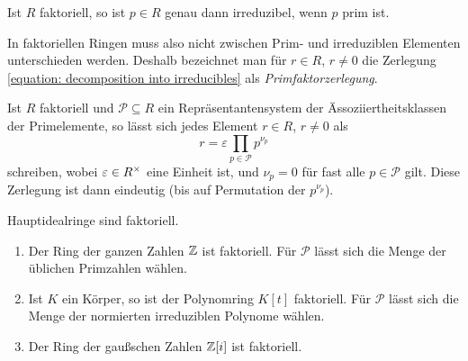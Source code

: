 \begin{lemma}
  Ist $R$ faktoriell, so ist $p \in R$ genau dann irreduzibel, wenn $p$ prim ist.
\end{lemma}

In faktoriellen Ringen muss also nicht zwischen Prim- und irreduziblen Elementen unterschieden werden.
Deshalb bezeichnet man für $r \in R$, $r \neq 0$ die Zerlegung \eqref{equation: decomposition into irreducibles} als \emph{Primfaktorzerlegung}.

\begin{remark}
  Ist $R$ faktoriell und $\mathcal{P} \subseteq R$ ein Repräsentantensystem der Ässoziiertheitsklassen der Primelemente, so lässt sich jedes Element $r \in R$, $r \neq 0$ als
  \[
    r = \varepsilon \prod_{p \in \mathcal{P}} p^{\nu_p}
  \]
  schreiben, wobei $\varepsilon \in R^{\times}$ eine Einheit ist, und $\nu_p = 0$ für fast alle $p \in \mathcal{P}$ gilt.
  Diese Zerlegung ist dann eindeutig (bis auf Permutation der $p^{\nu_p}$).
\end{remark}


\begin{proposition}
  Hauptidealringe sind faktoriell.
\end{proposition}

\begin{example}
  \begin{enumerate}
    \item
      Der Ring der ganzen Zahlen $\mathbb{Z}$ ist faktoriell.
      Für $\mathcal{P}$ lässt sich die Menge der üblichen Primzahlen wählen.
    \item
      Ist $K$ ein Körper, so ist der Polynomring $K[t]$ faktoriell.
      Für $\mathcal{P}$ lässt sich die Menge der normierten irreduziblen Polynome wählen.
    \item
      Der Ring der gaußschen Zahlen $\mathbb{Z}[i]$ ist faktoriell.
  \end{enumerate}
\end{example}

